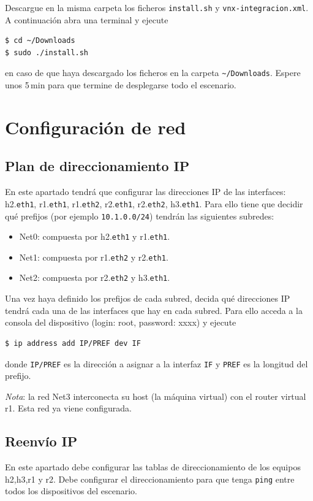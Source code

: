 \documentclass{upmassignment}
\begin{document}
Descargue en la misma carpeta los ficheros
\texttt{install.sh} y
\texttt{vnx-integracion.xml}.
A continuación abra una terminal
y ejecute
\begin{lstlisting}[language=bash]
$ cd ~/Downloads
$ sudo ./install.sh
\end{lstlisting}
en caso de que haya descargado los
ficheros en la carpeta
\texttt{\~{}/Downloads}.
Espere unos 5\,\textrm{min} para que
termine de desplegarse todo el escenario.



\section*{Configuración de red}
\subsection*{Plan de direccionamiento IP}
En este apartado tendrá que configurar
las direcciones IP de las interfaces:
h2.\texttt{eth1},
r1.\texttt{eth1},
r1.\texttt{eth2},
r2.\texttt{eth1},
r2.\texttt{eth2},
h3.\texttt{eth1}.
Para ello tiene que decidir qué prefijos
(por ejemplo \texttt{10.1.0.0/24})
tendrán las siguientes subredes:
\begin{itemize}
    \item Net0: compuesta por
        h2.\texttt{eth1} y
        r1.\texttt{eth1}.
    \item Net1: compuesta por
        r1.\texttt{eth2} y
        r2.\texttt{eth1}.
    \item Net2: compuesta por
        r2.\texttt{eth2} y
        h3.\texttt{eth1}.
\end{itemize}

Una vez haya definido los prefijos
de cada subred, decida qué direcciones
IP tendrá cada una de las interfaces que
hay en cada subred.
Para ello acceda a la consola del
dispositivo
(login: root, password: xxxx)
y ejecute
\begin{lstlisting}[language=bash]
$ ip address add IP/PREF dev IF
\end{lstlisting}
donde \texttt{IP/PREF} es la dirección
a asignar a la interfaz \texttt{IF}
y \texttt{PREF} es la longitud del prefijo.

\emph{Nota}: la red Net3 interconecta
su host (la máquina virtual)
con el router virtual r1.
Esta red ya viene configurada.


\subsection*{Reenvío IP}
En este apartado debe configurar las
tablas de direccionamiento de los
equipos h2,h3,r1 y r2.
Debe configurar el direccionamiento
para que tenga \texttt{ping}
entre todos los dispositivos del escenario.
\end{document}
